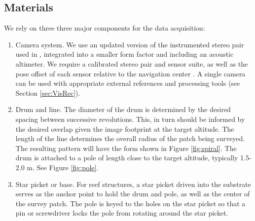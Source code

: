 
\subsection{Materials}
We rely on three three major components for the data acquisition:
\begin{enumerate}
\item Camera system. We use an updated version of the instrumented stereo pair used in \cite{Henderson_2013} \cite{Camilli_2007}, integrated into a smaller form factor and including an acoustic altimeter. We require a calibrated stereo pair and sensor suite, as well as the pose offset of each sensor relative to the navigation center \cite{Johnson_Roberson_2013} \cite{Mahon_2008}. A single camera can be used with appropriate external references and processing tools (see Section \ref{sec:VisRec}).
\item Drum and line. The diameter of the drum is determined by the desired spacing between successive revolutions. This, in turn should be informed by the desired overlap given the image footprint at the target altitude. The length of the line determines the overall radius of the patch being surveyed. The resulting pattern will have the form shown in Figure \ref{fig:spiral}. The drum is attached to a pole of length close to the target altitude, typically 1.5-2.0 m. See Figure \ref{fig:pole}.




\item Star picket or base. For reef structures, a star picket driven into the substrate serves as the anchor point to hold the drum and pole, as well as the center of the survey patch. The pole is keyed to the holes on the star picket so that a pin or screwdriver locks the pole from rotating around the star picket.

\end{enumerate}


  